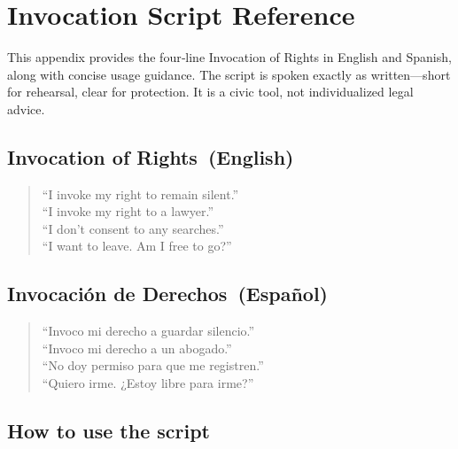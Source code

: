 \section{Invocation Script Reference}

This appendix provides the four‑line Invocation of Rights in English and Spanish, along with concise usage guidance. The script is spoken exactly as written—short for rehearsal, clear for protection. It is a civic tool, not individualized legal advice.

\subsection*{Invocation of Rights (English)}
\begin{quote}
``I invoke my right to remain silent.''\\
``I invoke my right to a lawyer.''\\
``I don’t consent to any searches.''\\
``I want to leave. Am I free to go?''
\end{quote}

\subsection*{Invocación de Derechos (Español)}
\begin{quote}
``Invoco mi derecho a guardar silencio.''\\
``Invoco mi derecho a un abogado.''\\
``No doy permiso para que me registren.''\\
``Quiero irme. ¿Estoy libre para irme?''
\end{quote}

\subsection*{How to use the script}

